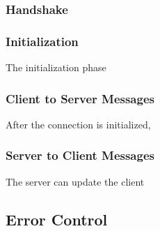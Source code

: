 \subsubsection{Handshake}
\label{sec:pdus:pdu:hs}


\subsubsection{Initialization}
\label{sec:pdus:pdu:init}

The initialization phase


\subsubsection{Client to Server Messages}
\label{sec:pdus:pdu:c_to_s}

After the connection is initialized,

\subsubsection{Server to Client Messages}
\label{sec:pdus:pdu:s_to_c}

The server can update the client 
\subsection{Error Control}
\label{sec:pdus:err}


